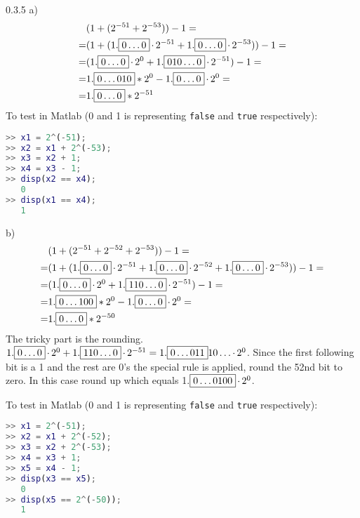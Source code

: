 \begin{task}{0.3.5 a)}
\begin{align*}
&(1+(2^{-51}+2^{-53}))-1= \\ =
&(1+(1.\boxed{0\ldots0}\operatorname{\cdot}2^{-51}+1.\boxed{0\ldots0}\operatorname{\cdot}2^{-53}))-1= \\ =
&(1.\boxed{0\ldots0}\operatorname{\cdot}2^0+1.\boxed{010\ldots0}\operatorname{\cdot}2^{-51})-1= \\ =
&1.\boxed{0\ldots010}*2^0-1.\boxed{0\ldots0}\operatorname{\cdot}2^0= \\ =
&1.\boxed{0\ldots0}*2^{-51}
\end{align*}
To test in Matlab (0 and 1 is representing \texttt{false} and \texttt{true} respectively):
\begin{lstlisting}[language=Matlab]
>> x1 = 2^(-51);
>> x2 = x1 + 2^(-53);
>> x3 = x2 + 1;
>> x4 = x3 - 1;
>> disp(x2 == x4);
   0
>> disp(x1 == x4);
   1
\end{lstlisting}
\end{task}

\begin{task}{b)}
\begin{align*}
&(1+(2^{-51}+2^{-52}+2^{-53}))-1= \\ =
&(1+(1.\boxed{0\ldots0}\operatorname{\cdot}2^{-51}+1.\boxed{0\ldots0}\operatorname{\cdot}2^{-52}+1.\boxed{0\ldots0}\operatorname{\cdot}2^{-53}))-1= \\ =
&(1.\boxed{0\ldots0}\operatorname{\cdot}2^0+1.\boxed{110\ldots0}\operatorname{\cdot}2^{-51})-1= \\ =
&1.\boxed{0\ldots100}*2^0-1.\boxed{0\ldots0}\operatorname{\cdot}2^0= \\ =
&1.\boxed{0\ldots0}*2^{-50}
\end{align*}
The tricky part is the rounding. $1.\boxed{0\ldots0}\operatorname{\cdot}2^0+1.\boxed{110\ldots0}\operatorname{\cdot}2^{-51}=1.\boxed{0\ldots011}10\ldots\operatorname{\cdot}2^0$. Since the first following bit is a 1 and the rest are 0's the special rule is applied, round the 52nd bit to zero. In this case round up which equals 1.$\boxed{0\ldots0100}\operatorname{\cdot}2^0$.

To test in Matlab (0 and 1 is representing \texttt{false} and \texttt{true} respectively):
\begin{lstlisting}[language=Matlab]
>> x1 = 2^(-51);
>> x2 = x1 + 2^(-52);
>> x3 = x2 + 2^(-53);
>> x4 = x3 + 1;
>> x5 = x4 - 1;
>> disp(x3 == x5);
   0
>> disp(x5 == 2^(-50));
   1
\end{lstlisting}
\end{task}
